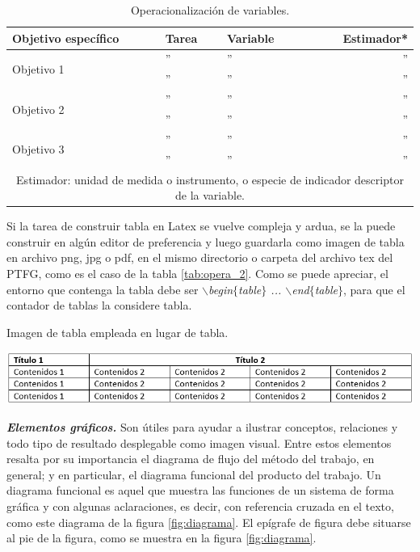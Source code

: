 \documentclass[12pt,a4paper]{article}
\begin{document}
\begin{center}
\begin{table}[h]
\begin{center}
\caption{Operacionalización de variables.}\label{tab:opera}
\begin{tabular}{||l|l|l|r||}
\hline
\cellcolor{gray!25} Objetivo específico& \cellcolor{gray!25} Tarea & \cellcolor{gray!25} Variable &\cellcolor{gray!25} Estimador*\\
\hline
\multirow{2}{*}{Objetivo 1}&''&''&''\\
&''&''&''\\
\hline
\multirow{2}{*}{Objetivo 2}&''&''&''\\
&''&''&''\\
\hline
\multirow{2}{*}{Objetivo 3}&''&''&''\\
&''&''&''\\
\hline
\multicolumn{4}{||c||}{{\scriptsize *Estimador: unidad de medida o instrumento, o especie de indicador descriptor de la variable.}}\\
\hline
\end{tabular}
\end{center}
\end{table}
\end{center}

Si la tarea de construir tabla en Latex se vuelve compleja y ardua, se la puede construir en algún editor de preferencia y luego guardarla como imagen de tabla en archivo png, jpg o pdf, en el mismo directorio o carpeta del archivo tex del PTFG, como es el caso de la tabla \ref{tab:opera_2}. Como se puede apreciar, el entorno que contenga la tabla debe ser \textit{$\backslash$begin$\lbrace$table$\rbrace$ ... $\backslash$end$\lbrace$table$\rbrace$}, para que el contador de tablas la considere tabla.

\begin{center}
\begin{table}[H]
\begin{center}\caption{Imagen de tabla empleada en lugar de tabla.\label{tab:opera_2}}
\includegraphics[scale=.8]{./operac}
\end{center}
\end{table}
\end{center}

\textbf{\textit{Elementos gráficos.}} Son útiles para ayudar a ilustrar conceptos, relaciones y todo tipo de resultado desplegable como imagen visual. Entre estos elementos resalta por su importancia el diagrama de flujo del método del trabajo, en general; y en particular, el diagrama funcional del producto del trabajo. Un diagrama funcional es aquel que muestra las funciones de un sistema de forma gráfica y con algunas aclaraciones, es decir, con referencia cruzada en el texto, como este diagrama de la figura \ref{fig:diagrama}. El epígrafe de figura debe situarse al pie de la figura, como se muestra en la figura \ref{fig:diagrama}.
\end{document}
